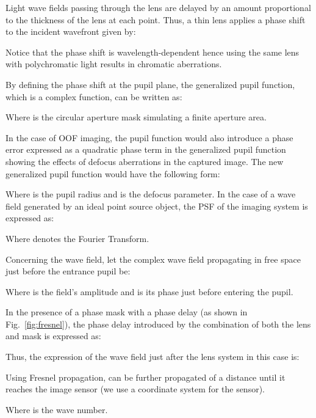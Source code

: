 \documentclass[preprint,5p,twocolumn]{elsarticle}
\begin{document}
Light wave fields passing through the lens are delayed by an amount proportional to the thickness of the lens  at each point. Thus, a thin lens applies a phase shift to the incident wavefront given by:



Notice that the phase shift is wavelength-dependent hence using the same lens with polychromatic light results in chromatic aberrations.



By defining the phase shift at the pupil plane, the generalized pupil function, which is a complex function, can be written as:



Where  is the circular aperture mask simulating a finite aperture area. 

In the case of OOF imaging, the pupil function would also introduce a phase error expressed as a quadratic phase term in the generalized pupil function showing the effects of defocus aberrations in the captured image. The new generalized pupil function would have the following form:



Where  is the pupil radius and  is the defocus parameter.
In the case of a wave field generated by an ideal point source object, the PSF of the imaging system is expressed as:



Where  denotes the Fourier Transform.

Concerning the wave field,  let the complex wave field  propagating in free space just before the entrance pupil be:



Where  is the field's amplitude and  is its phase just before entering the pupil.

In the presence of a phase mask with a phase delay  (as shown in Fig.~\ref{fig:fresnel}), the phase delay introduced by the combination of both the lens and mask is expressed as:



Thus, the expression of the wave field just after the lens system  in this case is:



Using Fresnel propagation,  can be further propagated of a distance  until it reaches the image sensor (we use a coordinate system  for the sensor). 



Where  is the wave number.
\end{document}
